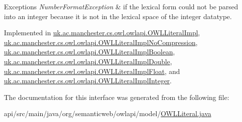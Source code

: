 \begin{DoxyExceptions}{Exceptions}
{\em Number\-Format\-Exception} & if the lexical form could not be parsed into an integer because it is not in the lexical space of the integer datatype. \\
\hline
\end{DoxyExceptions}


Implemented in \hyperlink{classuk_1_1ac_1_1manchester_1_1cs_1_1owl_1_1owlapi_1_1_o_w_l_literal_impl_a3f5f8512e171738d6966d6fca1d8285a}{uk.\-ac.\-manchester.\-cs.\-owl.\-owlapi.\-O\-W\-L\-Literal\-Impl}, \hyperlink{classuk_1_1ac_1_1manchester_1_1cs_1_1owl_1_1owlapi_1_1_o_w_l_literal_impl_no_compression_a5cfd9c8500615e677554135c856123b9}{uk.\-ac.\-manchester.\-cs.\-owl.\-owlapi.\-O\-W\-L\-Literal\-Impl\-No\-Compression}, \hyperlink{classuk_1_1ac_1_1manchester_1_1cs_1_1owl_1_1owlapi_1_1_o_w_l_literal_impl_boolean_af783a6005225e447e1c5b0b13181201b}{uk.\-ac.\-manchester.\-cs.\-owl.\-owlapi.\-O\-W\-L\-Literal\-Impl\-Boolean}, \hyperlink{classuk_1_1ac_1_1manchester_1_1cs_1_1owl_1_1owlapi_1_1_o_w_l_literal_impl_double_ae686de9bb9c4e782eb3236b72aa59648}{uk.\-ac.\-manchester.\-cs.\-owl.\-owlapi.\-O\-W\-L\-Literal\-Impl\-Double}, \hyperlink{classuk_1_1ac_1_1manchester_1_1cs_1_1owl_1_1owlapi_1_1_o_w_l_literal_impl_float_ae14d637e8d90f158ac9a7aef8584def4}{uk.\-ac.\-manchester.\-cs.\-owl.\-owlapi.\-O\-W\-L\-Literal\-Impl\-Float}, and \hyperlink{classuk_1_1ac_1_1manchester_1_1cs_1_1owl_1_1owlapi_1_1_o_w_l_literal_impl_integer_a4361afc596a12c0984276bdebb91c32a}{uk.\-ac.\-manchester.\-cs.\-owl.\-owlapi.\-O\-W\-L\-Literal\-Impl\-Integer}.



The documentation for this interface was generated from the following file\-:\begin{DoxyCompactItemize}
\item 
api/src/main/java/org/semanticweb/owlapi/model/\hyperlink{_o_w_l_literal_8java}{O\-W\-L\-Literal.\-java}\end{DoxyCompactItemize}
